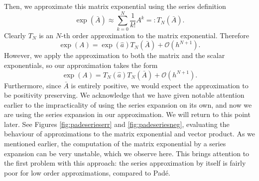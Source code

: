 Then, we approximate this matrix exponential using the series definition
\begin{equation*}
    \exp(\bar{A}) \approx \sum_{k=0}^{N} \frac{1}{k!}A^k =: T_N(\bar{A}).
\end{equation*}
Clearly $T_N$ is an $N$-th order approximation to the matrix exponential.
Therefore
\begin{equation*}
    \exp(A) = \exp(\hat{a})T_N(\bar{A}) + \mathcal{O}(h^{N+1}).
\end{equation*}
However, we apply the approximation to both the matrix and the scalar exponentials, so our approximation takes the form
\begin{equation}
    \exp(A) = T_N(\hat{a})T_N(\bar{A}) + \mathcal{O}(h^{N+1}).
\end{equation}
Furthermore, since $\bar{A}$ is entirely positive, we would expect the approximation to be positivity preserving.
We acknowledge that we have given notable attention earlier to the impracticality of using the series expansion on its own, and now we are using the series expansion in our approximation.
We will return to this point later.
See Figures \ref{fig:padeserieserr} and \ref{fig:padeseriesneg}, evaluating the behaviour of approximations to the matrix exponential and vector product.
As we mentioned earlier, the computation of the matrix exponential by a series expansion can be very unstable,
which we observe here.
This brings attention to the first problem with this approach: the series approximation by itself is fairly poor for low order approximations, compared to Pad\'e. %

